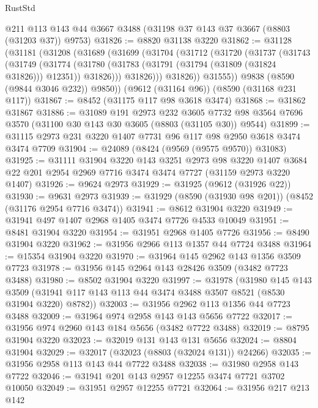 \begin{lexlean}{RustStd}
\begin{coremodule}
    @211
    @113
    @143
    @44
    @3667
    @3488
    (@31198 @37 @143 @37 @3667 (@8803 (@31203 @37)) @9753)
@31826 := @8820 @31138 @3220
@31862 := @31128
    (@31181
      (@31208
        (@31689
          (@31699
            (@31704
              (@31712
                (@31720
                  (@31737
                    (@31743
                      (@31749
                        (@31774
                          (@31780
                            (@31783 (@31791 (@31794 (@31809 (@31824 @31826))) @12351))
                            @31826)))
                      @31826)))
                @31826))
            @31555))
        @9838
        (@8590 (@9844 @3046 @232))
        @9850))
    (@9612 (@31164 @96))
    (@8590 (@31168 @231 @117))
@31867 := @8452 (@31175 @117 @98 @3618 @3474)
@31868 := @31862 @31867
@31886 := @31089
    @191
    @2973
    @232
    @3605
    @7732
    @98
    @3564
    @7696
    @3570
    (@31100 @30 @143 @30 @3605 (@8803 (@31105 @30)) @9544)
@31899 := @31115 @2973 @231 @3220 @1407 @7731 @96 @117 @98 @2950 @3618 @3474 @3474 @7709
@31904 := @24089 (@8424 (@9569 (@9575 @9570)) @31083)
@31925 := @31111
    @31904
    @3220
    @143
    @3251
    @2973
    @98
    @3220
    @1407
    @3684
    @22
    @201
    @2954
    @2969
    @7716
    @3474
    @3474
    @7727
    (@31159 @2973 @3220 @1407)
@31926 := @9624 @2973
@31929 := @31925 (@9612 (@31926 @22))
@31930 := @9631 @2973
@31939 := @31929 (@8590 (@31930 @98 @201)) (@8452 (@31176 @2954 @7716 @3474))
@31941 := @8612 @31904 @3220
@31949 := @31941 @497 @1407 @2968 @1405 @3474 @7726 @4533 @10049
@31951 := @8481 @31904 @3220
@31954 := @31951 @2968 @1405 @7726
@31956 := @8490 @31904 @3220
@31962 := @31956 @2966 @113 @1357 @44 @7724 @3488
@31964 := @15354 @31904 @3220
@31970 := @31964 @145 @2962 @143 @1356 @3509 @7723
@31978 := @31956 @145 @2964 @143 @28426 @3509 (@3482 @7723 @3488)
@31980 := @8502 @31904 @3220
@31997 := @31978
    (@31980
      @145
      @143
      @3509
      (@31941 @117 @143 @113 @44 @3474 @3488 @3507 @8521 (@8530 @31904 @3220) @8782))
@32003 := @31956 @2962 @113 @1356 @44 @7723 @3488
@32009 := @31964 @974 @2958 @143 @143 @5656 @7722
@32017 := @31956 @974 @2960 @143 @184 @5656 (@3482 @7722 @3488)
@32019 := @8795 @31904 @3220
@32023 := @32019 @131 @143 @131 @5656
@32024 := @8804 @31904
@32029 := @32017 (@32023 (@8803 (@32024 @131)) @24266)
@32035 := @31956 @2958 @113 @143 @44 @7722 @3488
@32038 := @31980 @2958 @143 @7722
@32046 := @31941 @201 @143 @2957 @12255 @3474 @7721 @3702 @10050
@32049 := @31951 @2957 @12255 @7721
@32064 := @31956
    @217
    @213
    @142

\end{coremodule}
\end{lexlean}
